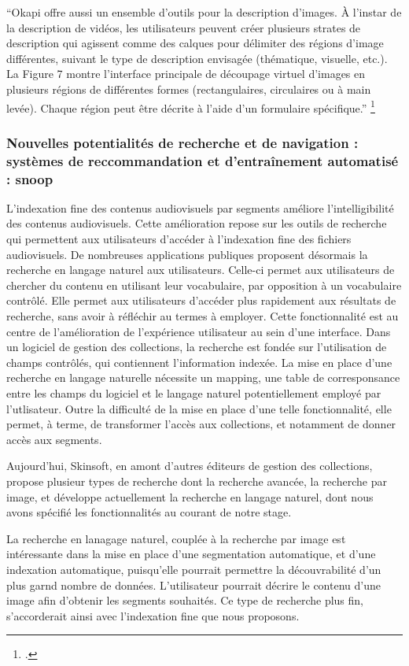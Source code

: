 “Okapi offre aussi un ensemble d’outils pour la description d’images. À l’instar de la description de vidéos, les utilisateurs peuvent créer plusieurs strates de description qui agissent comme des calques pour délimiter des régions d’image différentes, suivant le type de description envisagée (thématique, visuelle, etc.). La Figure 7 montre l’interface principale de découpage virtuel d’images en plusieurs régions de différentes formes (rectangulaires, circulaires ou à main levée). Chaque région peut être décrite à l’aide d’un formulaire spécifique.” \footcite{lalande2022}

\subsubsection{Nouvelles potentialités de recherche et de navigation : systèmes de reccommandation et d’entraînement automatisé : snoop}

L'indexation fine des contenus audiovisuels par segments améliore l'intelligibilité des contenus audiovisuels. Cette amélioration repose sur les outils de recherche qui permettent aux utilisateurs d'accéder à l'indexation fine des fichiers audiovisuels. 
De nombreuses applications publiques proposent désormais la recherche en langage naturel aux utilisateurs. Celle-ci permet aux utilisateurs de chercher du contenu en utilisant leur vocabulaire, par opposition à un vocabulaire contrôlé. Elle permet aux utilisateurs d'accéder plus rapidement aux résultats de recherche, sans avoir à réfléchir au termes à employer. Cette fonctionnalité est au centre de l'amélioration de l'expérience utilisateur au sein d'une interface. Dans un logiciel de gestion des collections, la recherche est fondée sur l'utilisation de champs contrôlés, qui contiennent l'information indexée. La mise en place d'une recherche en langage naturelle nécessite un mapping, une table de corresponsance entre les champs du logiciel et le langage naturel potentiellement employé par l'utlisateur. Outre la difficulté de la mise en place d'une telle fonctionnalité, elle permet, à terme, de transformer l'accès aux collections, et notamment de donner accès aux segments. 

Aujourd'hui, Skinsoft, en amont d'autres éditeurs de gestion des collections, propose plusieur types de recherche dont la recherche avancée, la recherche par image, et développe actuellement la recherche en langage naturel, dont nous avons spécifié les fonctionnalités au courant de notre stage. 

La recherche en lanagage naturel, couplée à la recherche par image est intéressante dans la mise en place d'une segmentation automatique, et d'une indexation automatique, puisqu'elle pourrait permettre la découvrabilité d'un plus garnd nombre de données. L'utilisateur pourrait décrire le contenu d'une image afin d'obtenir les segments souhaités. Ce type de recherche plus fin, s'accorderait ainsi avec l'indexation fine que nous proposons. 

